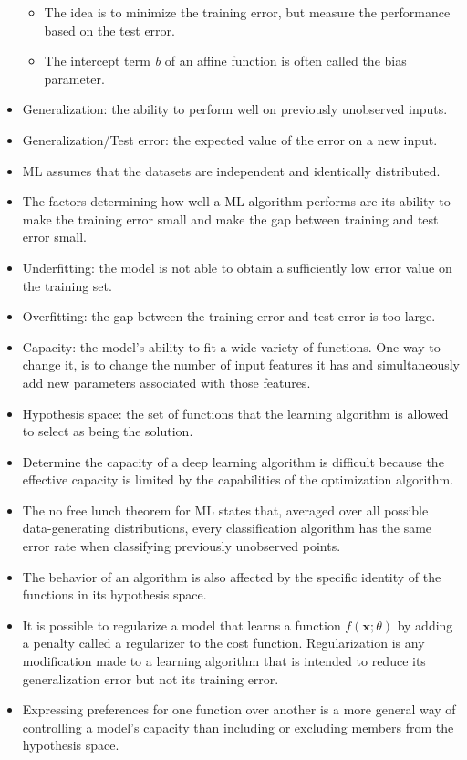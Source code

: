 \documentclass{article}
\begin{document}
\begin{itemize}
\begin{itemize}
\item The idea is to minimize the training error, but measure the performance based on the test error. 
\item The intercept term \textit{b} of an affine function is often called the bias parameter.
\end{itemize}
\item Generalization: the ability to perform well on previously unobserved inputs.
\item Generalization/Test error: the expected value of the error on a new input.
\item ML assumes that the datasets are independent and identically distributed.
\item The factors determining how well a ML algorithm performs are its ability to make the training error small and make the gap between training and test error small.
\item Underfitting: the model is not able to obtain a sufficiently low error value on the training set.
\item Overfitting: the gap between the training error and test error is too large.
\item Capacity: the model's ability to fit a wide variety of functions. One way to change it, is to change the number of input features it has and simultaneously add new parameters associated with those features.
\item Hypothesis space: the set of functions that the learning algorithm is allowed to select as being the solution.
\item Determine the capacity of a deep learning algorithm is difficult because the effective capacity is limited by the capabilities of the optimization algorithm.
\item The no free lunch theorem for ML states that, averaged over all possible data-generating distributions, every classification algorithm has the same error rate when classifying previously unobserved points.
\item The behavior of an algorithm is also affected by the specific identity of the functions in its hypothesis space.
\item It is possible to regularize a model that learns a function \(f(\boldsymbol{x}; \theta)\) by adding a penalty called a regularizer to the cost function. Regularization is any modification made to a learning algorithm that is intended to reduce its generalization error but not its training error.
\item Expressing preferences for one function over another is a more general way of controlling a model's capacity than including or excluding members from the hypothesis space.

\end{itemize}
\end{document}
